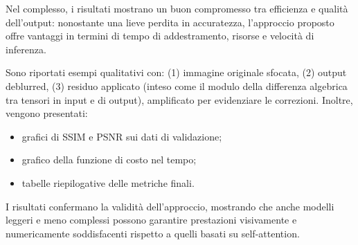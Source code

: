 \documentclass[a4paper,10pt,twocolumn]{article}
\begin{document}
Nel complesso, i risultati mostrano un buon compromesso tra efficienza e qualità dell'output: nonostante una lieve perdita in accuratezza, l'approccio proposto offre vantaggi in termini di tempo di addestramento, risorse e velocità di inferenza.

Sono riportati esempi qualitativi con: (1) immagine originale sfocata, (2) output deblurred, (3) residuo applicato (inteso come il modulo della differenza algebrica tra tensori in input e di output), amplificato per evidenziare le correzioni. Inoltre, vengono presentati:

\begin{itemize}
  \item grafici di SSIM e PSNR sui dati di validazione;

  \item grafico della funzione di costo nel tempo;

  \item tabelle riepilogative delle metriche finali.
\end{itemize}

I risultati confermano la validità dell’approccio, mostrando che anche modelli leggeri e meno complessi possono garantire prestazioni visivamente e numericamente soddisfacenti rispetto a quelli basati su self-attention.

\FloatBarrier
\end{document}
